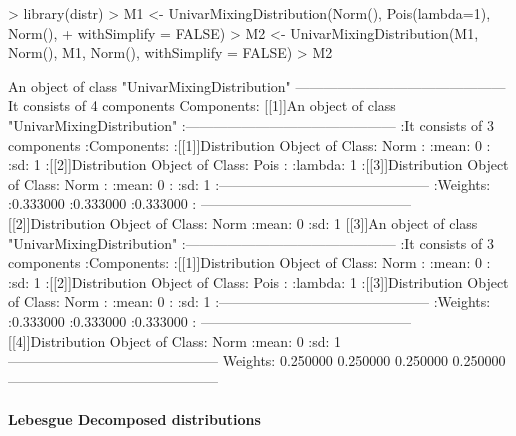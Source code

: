\documentclass[11pt]{article}
\begin{document}
\begin{Schunk}
\begin{Sinput}
> library(distr)
> M1 <- UnivarMixingDistribution(Norm(), Pois(lambda=1), Norm(),
+       withSimplify = FALSE)
> M2 <- UnivarMixingDistribution(M1, Norm(), M1, Norm(), withSimplify = FALSE)
> M2
\end{Sinput}
\begin{Soutput}
An object of class "UnivarMixingDistribution"
 ---------------------------------------------
 It consists of  4 components
 Components:
 [[1]]An object of class "UnivarMixingDistribution"
       :---------------------------------------------
       :It consists of  3 components
       :Components:
       :[[1]]Distribution Object of Class: Norm
       :      :mean: 0
       :      :sd: 1
       :[[2]]Distribution Object of Class: Pois
       :      :lambda: 1
       :[[3]]Distribution Object of Class: Norm
       :      :mean: 0
       :      :sd: 1
       :---------------------------------------------
       :Weights:
       :0.333000       :0.333000       :0.333000       :
 ---------------------------------------------
 [[2]]Distribution Object of Class: Norm
       :mean: 0
       :sd: 1
 [[3]]An object of class "UnivarMixingDistribution"
       :---------------------------------------------
       :It consists of  3 components
       :Components:
       :[[1]]Distribution Object of Class: Norm
       :      :mean: 0
       :      :sd: 1
       :[[2]]Distribution Object of Class: Pois
       :      :lambda: 1
       :[[3]]Distribution Object of Class: Norm
       :      :mean: 0
       :      :sd: 1
       :---------------------------------------------
       :Weights:
       :0.333000       :0.333000       :0.333000       :
 ---------------------------------------------
 [[4]]Distribution Object of Class: Norm
       :mean: 0
       :sd: 1
 ---------------------------------------------
 Weights:
 0.250000 0.250000 0.250000 0.250000
 ---------------------------------------------
\end{Soutput}
\end{Schunk}

\paragraph{Lebesgue Decomposed distributions}
\end{document}
